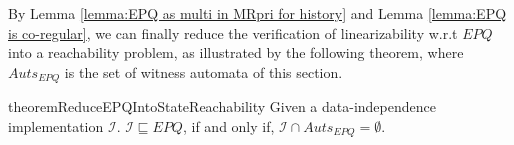 By Lemma \ref{lemma:EPQ as multi in MRpri for history} and Lemma \ref{lemma:EPQ is co-regular}, we can finally reduce the verification of linearizability w.r.t $\textit{EPQ}$ into a reachability problem, as illustrated by the following theorem, where $\textit{Auts}_{\textit{EPQ}}$ is the set of witness automata of this section.

\begin{restatable}{theorem}{ReduceEPQIntoStateReachability}
\label{lemma:reduce EPQ into state reachability}
Given a data-independence implementation $\mathcal{I}$. $\mathcal{I} \sqsubseteq \textit{EPQ}$, if and only if, $\mathcal{I} \cap \textit{Auts}_{\textit{EPQ}} = \emptyset$.
\end{restatable}



